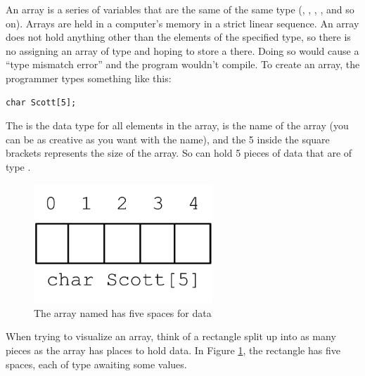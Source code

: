 
An array is a series of variables that are the same of the same type (, , , , and so on).
Arrays are held in a computer's memory in a strict linear sequence.
An array does not hold anything other than the elements of the specified type, so there is no assigning an array of type  and hoping to store a  there. 
Doing so would cause a ``type mismatch error'' and the program wouldn't compile. 
To create an array, the programmer types something like this:

\noindent\begin{minipage}{\linewidth}\begin{lstlisting}
char Scott[5];
\end{lstlisting}\end{minipage}

The  is the data type for all elements in the array,  is the name of the array (you can be as creative as you want with the name), and the 5 inside the square brackets represents the size of the array. 
So  can hold 5 pieces of data that are of type . 

\begin{figure}[tbh]
  \centering
  \includegraphics[width=0.6\textwidth]{diagrams/array-diagram-1.pdf}
  \caption{The array named  has five spaces for  data} \label{fig:array-diagram-1}
\end{figure}

When trying to visualize an array, think of a rectangle split up into as many pieces as the array has places to hold data.
In Figure \ref{fig:array-diagram-1}, the rectangle has five spaces, each of type  awaiting some values. 

